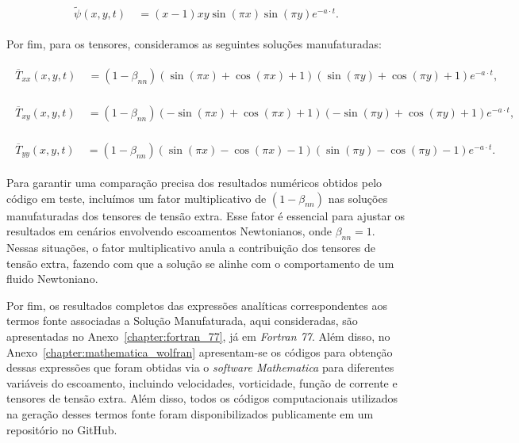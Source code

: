 \begin{gather}
    \begin{aligned}
        \widetilde{\psi}(x,y,t) &~= (x-1) x y \sin(\pi x)\sin(\pi y) e^{-a\cdot t}.\label{eq:psi_case0}
    \end{aligned}
\end{gather}

Por fim, para os tensores, consideramos as seguintes soluções manufaturadas:

\begin{gather}
    \begin{aligned}
        \overline{T}_{xx}(x,y,t) &~= (1-\beta_{nn})\left(\sin(\pi x) + \cos(\pi x) + 1\right) \left(\sin(\pi y) + \cos(\pi y) + 1\right)e^{-a\cdot t},\label{eq:txx_case0}
    \end{aligned}
\end{gather}

\begin{gather}
    \begin{aligned}
        \overline{T}_{xy}(x,y,t) &~= (1-\beta_{nn})\left(-\sin(\pi x) + \cos(\pi x) + 1\right) \left(-\sin(\pi y) + \cos(\pi y) + 1\right)e^{-a\cdot t},\label{eq:txy_case0}
    \end{aligned}
\end{gather}

\begin{gather}
    \begin{aligned}
        \overline{T}_{yy}(x,y,t) &~= (1-\beta_{nn})\left(\sin(\pi x) - \cos(\pi x) - 1\right) \left(\sin(\pi y) - \cos(\pi y) - 1\right)e^{-a\cdot t}.\label{eq:tyy_case0}
    \end{aligned}
\end{gather}

Para garantir uma comparação precisa dos resultados numéricos obtidos pelo código em teste, incluímos um fator multiplicativo de $(1-\beta_{nn})$ nas soluções manufaturadas dos tensores de tensão extra. Esse fator é essencial para ajustar os resultados em cenários envolvendo escoamentos Newtonianos, onde $\beta_{nn} = 1$. Nessas situações, o fator multiplicativo anula a contribuição dos tensores de tensão extra, fazendo com que a solução se alinhe com o comportamento de um fluido Newtoniano.

Por fim, os resultados completos das expressões analíticas correspondentes aos termos fonte associadas a Solução Manufaturada, aqui consideradas, são apresentadas no Anexo~\ref{chapter:fortran_77}, já em \textit{Fortran 77}. Além disso, no Anexo~\ref{chapter:mathematica_wolfran} apresentam-se os códigos para obtenção dessas expressões que foram obtidas via o \textit{ software Mathematica} para diferentes variáveis do escoamento, incluindo velocidades, vorticidade, função de corrente e tensores de tensão extra. Além disso, todos os códigos computacionais utilizados na geração desses termos fonte foram disponibilizados publicamente em um repositório no GitHub.